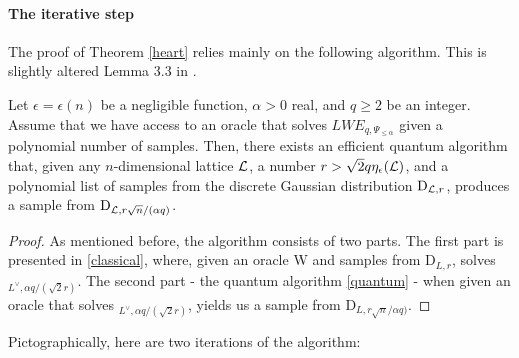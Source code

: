 \paragraph{The iterative step}
The proof of Theorem \ref{heart} relies mainly on the following algorithm. This is slightly altered Lemma 3.3 in \cite{regev}. 
\begin{lemma}\label{is}
	Let $\epsilon = \epsilon(n)$ be a negligible function, $\alpha > 0$ real, and $q \geq 2$ be an integer. Assume that we have access to an oracle that solves $LWE_{q,\Psi_{\leq \alpha}}$ given a polynomial number of samples. Then, there exists an efficient quantum algorithm that, given any $n$-dimensional lattice $\mathcal{L}$, a number $r > \sqrt{2}q \eta_{\epsilon}(\mathcal{L})$, and a polynomial list of samples from the discrete Gaussian distribution $\text{D}_{\mathcal{L},r}$, produces a sample from $\text{D}_{\mathcal{L},r\sqrt{n}/(\alpha q)}$.
\end{lemma}
\begin{proof}
	As mentioned before, the algorithm consists of two parts. The first part is presented in \ref{classical}, where, given an oracle W and samples from $\text{D}_{L,r}$, solves $_{L^{\vee}, \alpha q / (\sqrt{2} r)}$. The second part - the quantum algorithm \ref{quantum} - when given an oracle that solves $_{L^{\vee}, \alpha q / (\sqrt{2} r)}$, yields us a sample from $\text{D}_{L, r\sqrt{n}/\alpha q)}$.
\end{proof}

Pictographically, here are two iterations of the algorithm:\\

